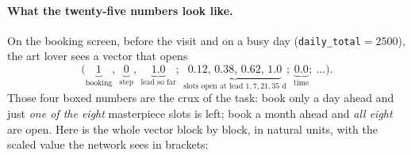 \documentclass[11pt]{article}
\begin{document}
\paragraph{What the twenty-five numbers look like.} On the booking screen, before the visit and on
a busy day (\texttt{daily\_total}$=2500$), the art lover sees a vector that opens
\[
\bigl(\underbrace{1}_{\text{booking}},\ \underbrace{0}_{\text{step}},\ \underbrace{1.0}_{\text{lead so far}};\ \underbrace{0.12,\,0.38,\,0.62,\,1.0}_{\text{slots open at lead }1,7,21,35\text{ d}};\ \underbrace{0.0}_{\text{time}};\ \dots\bigr).
\]
Those four boxed numbers are the crux of the task: book only a day ahead and just \emph{one of the
eight} masterpiece slots is left; book a month ahead and \emph{all eight} are open. Here is the whole
vector block by block, in natural units, with the scaled value the network sees in brackets:
\end{document}
